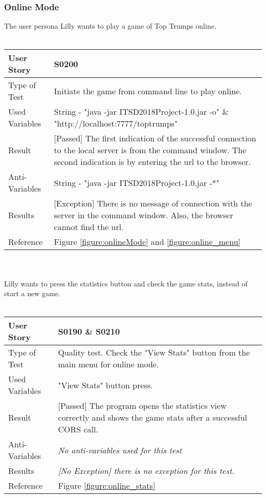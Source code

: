\subsubsection{Online Mode}
\vspace{0.2cm} 
The user persona Lilly wants to play a game of Top Trumps online.\\
\vspace{0.2cm}\\  
\begin{tabular}{l | p{12cm}}
User Story & \textbf{S0200}\\ \hline
Type of Test & Initiate the game from command line to play online.\\ \hline
Used Variables & String - "java -jar ITSD2018Project-1.0.jar -o" \& "http://localhost:7777/toptrumps"\\ \hline
Result & [Passed] The first indication of the successful connection to the local server is from the command window. The second indication is by entering the url to the browser.\\ \hline
Anti-Variables & String - "java -jar ITSD2018Project-1.0.jar -*"\\ \hline
Results & [Exception] There is no message of connection with the server in the command window. Also, the browser cannot find the url.\\ \hline
Reference & Figure \ref{figure:onlineMode} and \ref{figure:online_menu} \\ \hline
\end{tabular}\\
\vspace{0.2cm}\\
Lilly wants to press the statistics button and check the game stats, instead of start a new game.\\
\vspace{0.2cm}\\  
\begin{tabular}{l | p{12cm}}
User Story & \textbf{S0190} \& \textbf{S0210}\\ \hline
Type of Test & Quality test. Check the "View Stats" button from the main menu for online mode.\\ \hline
Used Variables & "View Stats" button press.\\ \hline
Result & [Passed] The program opens the statistics view correctly and shows the game stats after a successful CORS call.\\ \hline
Anti-Variables & \textit{No anti-variables used for this test}\\ \hline
Results & \textit{[No Exception] there is no exception for this test.}\\ \hline
Reference & Figure \ref{figure:online_stats}\\ \hline
\end{tabular}\\
